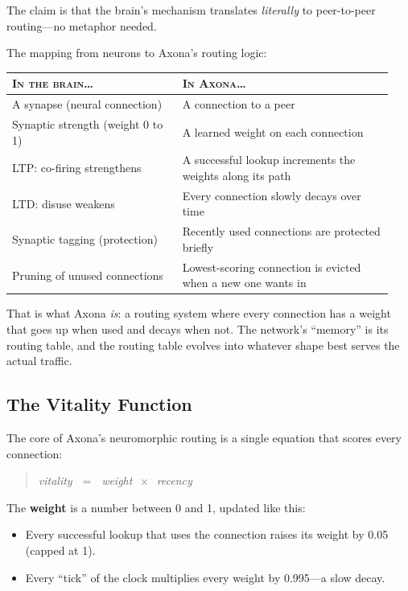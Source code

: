 \documentclass[nobib]{tufte-handout}
\begin{document}
The claim is that the brain's mechanism translates \emph{literally} to peer-to-peer routing---no metaphor needed.

The mapping from neurons to Axona's routing logic:

\begin{table}[h]
\small
\begin{tabular}{@{}p{0.42\linewidth}p{0.52\linewidth}@{}}
\toprule
\textsc{In the brain\dots} & \textsc{In Axona\dots} \\
\midrule
A synapse (neural connection) & A connection to a peer \\
Synaptic strength (weight 0 to 1) & A learned weight on each connection \\
LTP: co-firing strengthens & A successful lookup increments the weights along its path \\
LTD: disuse weakens & Every connection slowly decays over time \\
Synaptic tagging (protection) & Recently used connections are protected briefly \\
Pruning of unused connections & Lowest-scoring connection is evicted when a new one wants in \\
\bottomrule
\end{tabular}
\end{table}

That is what Axona \emph{is}: a routing system where every connection has a weight that goes up when used and decays when not. The network's ``memory'' is its routing table, and the routing table evolves into whatever shape best serves the actual traffic.

\subsection{The Vitality Function}

The core of Axona's neuromorphic routing is a single equation that scores every connection:

\begin{quote}
\centering\itshape
vitality $\;=\;$ weight $\,\times\,$ recency
\end{quote}

The \textbf{weight} is a number between 0 and 1, updated like this:
\begin{itemize}
  \item Every successful lookup that uses the connection raises its weight by 0.05 (capped at 1).
  \item Every ``tick'' of the clock multiplies every weight by 0.995---a slow decay.
\end{itemize}
\end{document}
